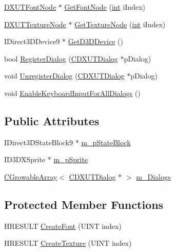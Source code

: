 \begin{DoxyCompactItemize}
\item 
\hyperlink{struct_d_x_u_t_font_node}{DXUTFontNode} $\ast$ \hyperlink{class_c_d_x_u_t_dialog_resource_manager_a06bc003b7adeab308924d576872d7808}{GetFontNode} (\hyperlink{_d_x_u_tgui_8cpp_a2d77ed03302b6978834ee3b6f57837fb}{int} iIndex)
\item 
\hyperlink{struct_d_x_u_t_texture_node}{DXUTTextureNode} $\ast$ \hyperlink{class_c_d_x_u_t_dialog_resource_manager_a1c4a4da7f12745983dd5f3f945457b6f}{GetTextureNode} (\hyperlink{_d_x_u_tgui_8cpp_a2d77ed03302b6978834ee3b6f57837fb}{int} iIndex)
\item 
IDirect3DDevice9 $\ast$ \hyperlink{class_c_d_x_u_t_dialog_resource_manager_a73c8686511bf3d782df524921915766b}{GetD3DDevice} ()
\item 
bool \hyperlink{class_c_d_x_u_t_dialog_resource_manager_a316e3fb9e1a6a5115b4e7e0e94952150}{RegisterDialog} (\hyperlink{class_c_d_x_u_t_dialog}{CDXUTDialog} $\ast$pDialog)
\item 
void \hyperlink{class_c_d_x_u_t_dialog_resource_manager_a82c0f8904b95862f2bcf6c6231b7c75f}{UnregisterDialog} (\hyperlink{class_c_d_x_u_t_dialog}{CDXUTDialog} $\ast$pDialog)
\item 
void \hyperlink{class_c_d_x_u_t_dialog_resource_manager_a8733abc35a666eefd8a673eb587fb6e8}{EnableKeyboardInputForAllDialogs} ()
\end{DoxyCompactItemize}
\subsection*{Public Attributes}
\begin{DoxyCompactItemize}
\item 
IDirect3DStateBlock9 $\ast$ \hyperlink{class_c_d_x_u_t_dialog_resource_manager_a68ecba684cf15356604fa77dd6ade31f}{m\_\-pStateBlock}
\item 
ID3DXSprite $\ast$ \hyperlink{class_c_d_x_u_t_dialog_resource_manager_a36b8710e919e00692dbfd4683b2529eb}{m\_\-pSprite}
\item 
\hyperlink{class_c_growable_array}{CGrowableArray}$<$ \hyperlink{class_c_d_x_u_t_dialog}{CDXUTDialog} $\ast$ $>$ \hyperlink{class_c_d_x_u_t_dialog_resource_manager_a6da7f26183db3fddce10b2e536dc066b}{m\_\-Dialogs}
\end{DoxyCompactItemize}
\subsection*{Protected Member Functions}
\begin{DoxyCompactItemize}
\item 
HRESULT \hyperlink{class_c_d_x_u_t_dialog_resource_manager_afd9720b2dfdd96e4a4434cefe4216af0}{CreateFont} (UINT index)
\item 
HRESULT \hyperlink{class_c_d_x_u_t_dialog_resource_manager_ae0bebe3ab6ef06f13e4abf84ac726458}{CreateTexture} (UINT index)
\end{DoxyCompactItemize}
